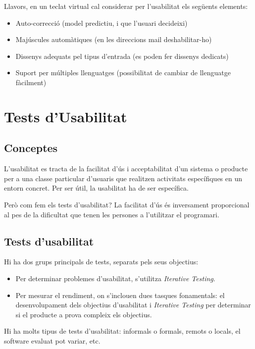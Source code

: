 \documentclass[12pt]{article}
\begin{document}
    Llavors, en un teclat virtual cal considerar per l'usabilitat els següents elements:
    \begin{itemize}
            \item Auto-correcció (model predictiu, i que l'usuari decideixi)
            \item Majúscules automàtiques (en les direccions mail deshabilitar-ho)
            \item Dissenys adequats pel tipus d'entrada (es poden fer dissenys dedicats)
            \item Suport per múltiples llenguatges (possibilitat de cambiar de llenguatge fàcilment)
    \end{itemize}

    \section{Tests d'Usabilitat}
    \subsection{Conceptes}
    L'usabilitat es tracta de la facilitat d'ús i acceptabilitat d'un sistema o producte per a una classe particular d'usuaris
    que realitzen activitats específiques en un entorn concret. Per ser útil, la usabilitat ha de ser específica.

    \hfill \break
    Però com fem els tests d'usabilitat? La facilitat d'ús és inversament proporcional al pes de la dificultat que tenen les persones 
    a l'utilitzar el programari.

    \subsection{Tests d'usabilitat}
    Hi ha dos grups principals de tests, separats pels seus objectius:
    \begin{itemize} 
        \item Per determinar problemes d'usabilitat, s'utilitza \textit{Iterative Testing}.
        \item Per mesurar el rendiment, on s'inclouen dues tasques fonamentals: el desenvolupament dels objectius 
        d'usabilitat i \textit{Iterative Testing} per determinar si el producte a prova compleix els objectius.
    \end{itemize}
    
    Hi ha molts tipus de tests d'usabilitat: informals o formals, remots o locals, el software evaluat pot variar, etc.
\end{document}
